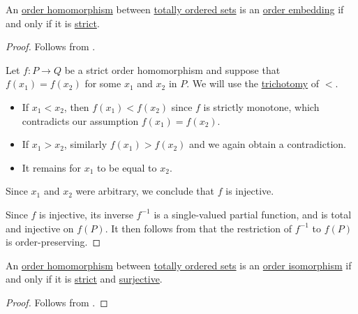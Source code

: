 \begin{proposition}\label{thm:total_order_embedding_iff_strict}
  An \hyperref[def:order_function/preserving]{order homomorphism} between \hyperref[def:totally_ordered_set]{totally ordered sets} is an \hyperref[def:order_function/embedding]{order embedding} if and only if it is \hyperref[def:order_function/preserving]{strict}.
\end{proposition}
\begin{proof}
  \SufficiencySubProof Follows from .

  \NecessitySubProof
   Let \( f: P \to Q \) be a strict order homomorphism and suppose that \( f(x_1) = f(x_2) \) for some \( x_1 \) and \( x_2 \) in \( P \). We will use the \hyperref[def:binary_relation/trichotomic]{trichotomy} of \( < \).
  \begin{itemize}
    \item If \( x_1 < x_2 \), then \( f(x_1) < f(x_2) \) since \( f \) is strictly monotone, which contradicts our assumption \( f(x_1) = f(x_2) \).

    \item If \( x_1 > x_2 \), similarly \( f(x_1) > f(x_2) \) and we again obtain a contradiction.

    \item It remains for \( x_1 \) to be equal to \( x_2 \).
  \end{itemize}

  Since \( x_1 \) and \( x_2 \) were arbitrary, we conclude that \( f \) is injective.

   Since \( f \) is injective, its inverse \( f^{-1} \) is a single-valued partial function, and is total and injective on \( f(P) \). It then follows from  that the restriction of \( f^{-1} \) to \( f(P) \) is order-preserving.
\end{proof}

\begin{corollary}\label{thm:totally_ordered_strict_isomorphisms}
  An \hyperref[def:order_function/preserving]{order homomorphism} between \hyperref[def:totally_ordered_set]{totally ordered sets} is an \hyperref[def:order_function/embedding]{order isomorphism} if and only if it is \hyperref[def:order_function/preserving]{strict} and \hyperref[def:function_invertibility/surjective]{surjective}.
\end{corollary}
\begin{proof}
  Follows from .
\end{proof}

